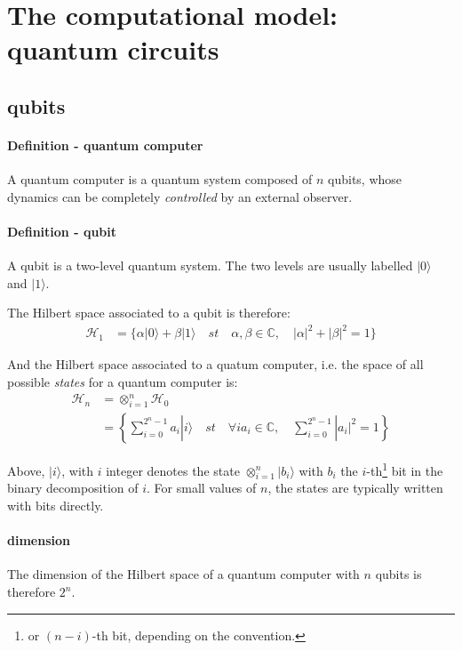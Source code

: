 \documentclass{article}
\begin{document}
\section{The computational model: quantum circuits}

\subsection{qubits}

\paragraph{Definition - quantum computer} A quantum computer is a quantum system composed of $n$ qubits,
whose dynamics can be completely \emph{controlled} by an external observer. 

\paragraph{Definition - qubit} A qubit is a two-level quantum system. The two levels are usually labelled
$|0\rangle$ and $|1\rangle$.

The Hilbert space associated to a qubit is therefore: 
\begin{align*}
\mathcal{H}_1 &= \{\alpha |0\rangle + \beta |1\rangle\quad st \quad\alpha,\beta\in\mathbb{C},\quad|\alpha|^{2}+|\beta|^2=1\}
\end{align*}

And the Hilbert space associated to a quatum computer, i.e. the space of all possible \emph{states} for a quantum computer is: 
\begin{align*}
\mathcal{H}_n &=  \otimes_{i=1}^{n} \mathcal{H}_0 \\
              &=  \left\{\sum_{i=0}^{2^n - 1} a_i |i\rangle\quad st\quad\forall i a_i \in \mathbb{C},\quad\sum_{i=0}^{2^n - 1} |a_i|^2 = 1 \right\} 
\end{align*}

Above, $|i\rangle$, with $i$ integer denotes the state $\otimes_{i=1}^{n} |b_i\rangle $ with $b_i$ the $i$-th\footnote{or $(n-i)$-th bit, depending on the
convention.} bit in the binary decomposition of $i$. For small values of $n$, the states are typically written with bits directly.

\paragraph{dimension} The dimension of the Hilbert space of a quantum computer with $n$ qubits is therefore $2^n$.
\end{document}
